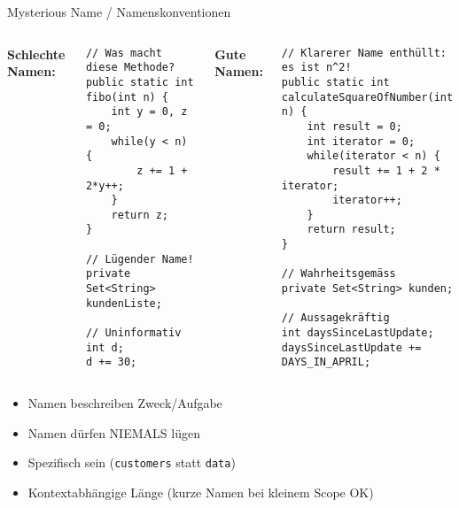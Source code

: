 \begin{frame}[fragile]{Mysterious Name / Namenskonventionen}
  \begin{columns}[T]
    \textbf{Schlechte Namen:}
    \begin{lstlisting}[style=java, basicstyle=\tiny\ttfamily]
// Was macht diese Methode?
public static int fibo(int n) {
    int y = 0, z = 0;
    while(y < n) {
        z += 1 + 2*y++;
    }
    return z;
}

// Lügender Name!
private Set<String> kundenListe;

// Uninformativ
int d;
d += 30;
    \end{lstlisting}

    \textbf{Gute Namen:}
    \begin{lstlisting}[style=java, basicstyle=\tiny\ttfamily]
// Klarerer Name enthüllt: es ist n^2!
public static int calculateSquareOfNumber(int n) {
    int result = 0;
    int iterator = 0;
    while(iterator < n) {
        result += 1 + 2 * iterator;
        iterator++;
    }
    return result;
}

// Wahrheitsgemäss
private Set<String> kunden;

// Aussagekräftig
int daysSinceLastUpdate;
daysSinceLastUpdate += DAYS_IN_APRIL;
    \end{lstlisting}
  \end{columns}

  \begin{itemize}
    \item Namen beschreiben Zweck/Aufgabe
    \item Namen dürfen NIEMALS lügen
    \item Spezifisch sein (\texttt{customers} statt \texttt{data})
    \item Kontextabhängige Länge (kurze Namen bei kleinem Scope OK)
  \end{itemize}
\end{frame}


